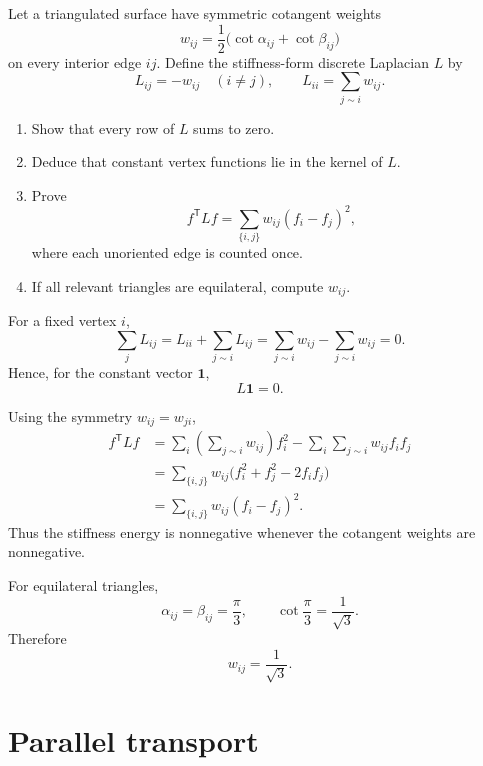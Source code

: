 \begin{problem}
\label{prob:vii-gap-41}
Let a triangulated surface have symmetric cotangent weights
\[
w_{ij}=\frac12\bigl(\cot\alpha_{ij}+\cot\beta_{ij}\bigr)
\]
on every interior edge \(ij\).  Define the stiffness-form discrete
Laplacian \(L\) by
\[
L_{ij}=-w_{ij}\quad(i\ne j),
\qquad
L_{ii}=\sum_{j\sim i}w_{ij}.
\]

\begin{enumerate}
\item Show that every row of \(L\) sums to zero.
\item Deduce that constant vertex functions lie in the kernel of \(L\).
\item Prove
      \[
      f^{\mathsf T}Lf
      =
      \sum_{\{i,j\}}w_{ij}(f_i-f_j)^2,
      \]
      where each unoriented edge is counted once.
\item If all relevant triangles are equilateral, compute \(w_{ij}\).
\end{enumerate}
\end{problem}

\begin{solution}
For a fixed vertex \(i\),
\[
\sum_j L_{ij}
=
L_{ii}+\sum_{j\sim i}L_{ij}
=
\sum_{j\sim i}w_{ij}-\sum_{j\sim i}w_{ij}
=0.
\]
Hence, for the constant vector \(\mathbf 1\),
\[
L\mathbf 1=0.
\]

Using the symmetry \(w_{ij}=w_{ji}\),
\[
\begin{aligned}
f^{\mathsf T}Lf
&=
\sum_i\left(\sum_{j\sim i}w_{ij}\right)f_i^2
-\sum_i\sum_{j\sim i}w_{ij}f_if_j\\
&=
\sum_{\{i,j\}}w_{ij}
\bigl(f_i^2+f_j^2-2f_if_j\bigr)\\
&=
\sum_{\{i,j\}}w_{ij}(f_i-f_j)^2.
\end{aligned}
\]
Thus the stiffness energy is nonnegative whenever the cotangent weights
are nonnegative.

For equilateral triangles,
\[
\alpha_{ij}=\beta_{ij}=\frac{\pi}{3},
\qquad
\cot\frac{\pi}{3}=\frac1{\sqrt3}.
\]
Therefore
\[
\boxed{w_{ij}=\frac1{\sqrt3}}.
\]
\end{solution}

\section{Parallel transport}

